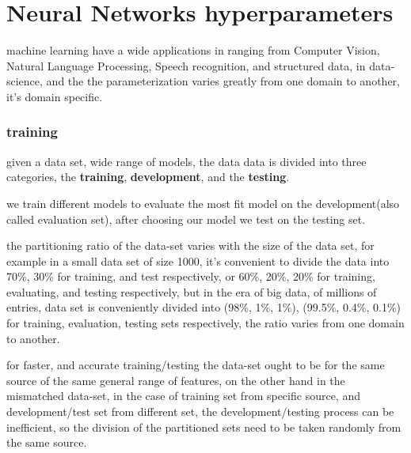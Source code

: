 \documentclass[4apaper,12pt]{book}
\begin{document}
\chapter {Neural Networks hyperparameters}
\begin{description}
\item machine learning have a wide applications in ranging from Computer Vision, Natural Language Processing, Speech recognition, and structured data, in data-science, and the the parameterization varies greatly from one domain to another, it's domain specific.
  \subsection{training}
\item  given a data set, wide range of models, the data  data is divided into three categories, the \textbf{training}, \textbf{development}, and the \textbf{testing}.
\item we train different models to evaluate the most fit model on the development(also called evaluation set), after choosing our model we test on the testing set.
\item the partitioning ratio of the data-set varies with the size of the data set, for example in a small data set of size 1000, it's convenient to divide the data into 70\%, 30\% for training, and test respectively, or 60\%, 20\%, 20\% for training, evaluating, and testing respectively, but in the era of big data, of millions of entries, data set is conveniently divided into (98\%, 1\%, 1\%), (99.5\%, 0.4\%, 0.1\%) for training, evaluation, testing sets respectively, the ratio varies from one domain to another.
\item for faster, and accurate training/testing the data-set ought to be for the same source of the same general range of features, on the other hand in the mismatched data-set, in the case of training set from specific source, and development/test set from different set, the development/testing process can be inefficient, so the division of the partitioned sets need to be taken randomly from the same source.

\end{description}
\end{document}
